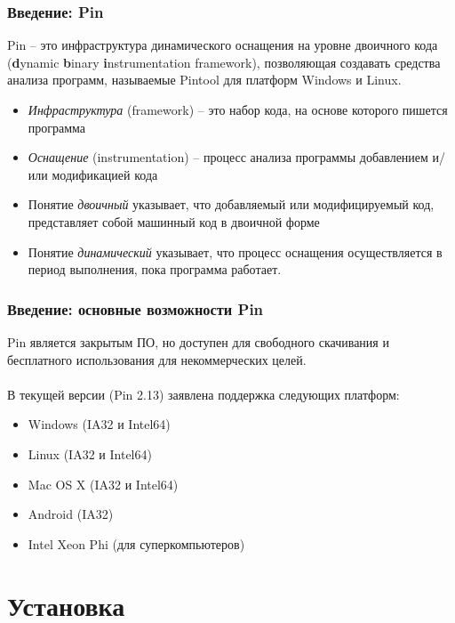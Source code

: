 \documentclass{beamer}
\begin{document}

\begin{frame}
\frametitle{Введение: Pin}
Pin -- это инфраструктура динамического оснащения на уровне двоичного кода (\textbf{d}ynamic \textbf{b}inary \textbf{i}nstrumentation framework), позволяющая создавать средства анализа программ, называемые Pintool для платформ Windows и Linux.
\begin{itemize}
\item \textit{Инфраструктура} (framework) -- это набор кода, на основе которого пишется программа
\item \textit{Оснащение} (instrumentation) -- процесс анализа программы добавлением и/или модификацией кода
\item Понятие \textit{двоичный} указывает, что добавляемый или модифицируемый код, представляет собой машинный код в двоичной форме
\item Понятие \textit{динамический} указывает, что процесс оснащения осуществляется в период выполнения, пока программа работает.
\end{itemize}
\end{frame}


\begin{frame}
\frametitle{Введение: основные возможности Pin}
Pin является закрытым ПО, но доступен для свободного скачивания и бесплатного использования для некоммерческих целей.\\~\\

В текущей версии (Pin 2.13) заявлена поддержка следующих платформ:
\begin{itemize}
\item Windows (IA32 и Intel64)
\item Linux (IA32 и Intel64)
\item Mac OS X (IA32 и Intel64)
\item Android (IA32)
\item Intel Xeon Phi (для суперкомпьютеров)
\end{itemize}
\end{frame}

\section{Установка}
\end{document}

